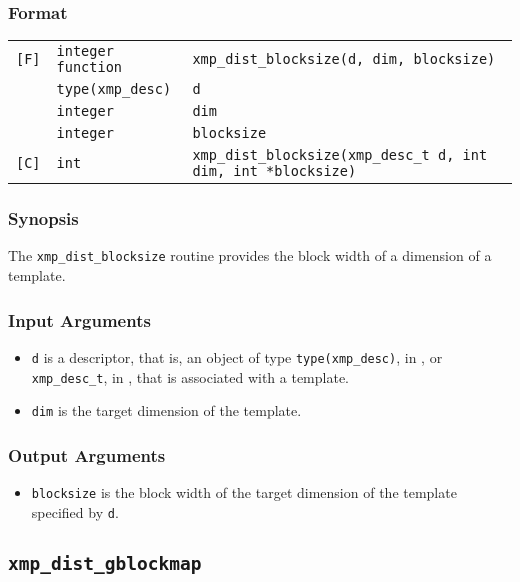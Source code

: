\subsubsection*{Format}

\begin{tabular}{lll}

\verb![F]!& {\tt integer function}& {\tt xmp\_dist\_blocksize(d, dim, blocksize)}\\
          & {\tt type(xmp\_desc)} & {\tt d}\\
          & {\tt integer} & {\tt dim}\\
          & {\tt integer} & {\tt blocksize}\\

\verb![C]!&  {\tt int}& {\tt xmp\_dist\_blocksize(xmp\_desc\_t d, int dim, int *blocksize)}\\

\end{tabular}

\subsubsection*{Synopsis}

The {\tt xmp\_dist\_blocksize} routine provides the block width of
a dimension of a template.


\subsubsection*{Input Arguments}
\begin{itemize}
 \item {\tt d} is a descriptor, that is, an object of type 
       {\tt type(xmp\_desc)}, in {\XMPF}, or {\tt xmp\_desc\_t},
       in {\XMPC}, that is associated with a template.
        \item {\tt dim} is the target dimension of the template.
\end{itemize}

\subsubsection*{Output Arguments}
\begin{itemize}
 \item {\tt blocksize} is the block width of the target dimension of
       the template specified by {\tt d}.
\end{itemize}


\subsection{\tt xmp\_dist\_gblockmap}


